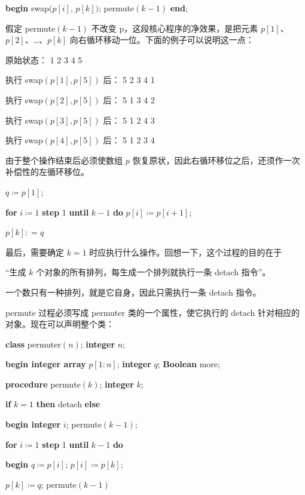 \quad \quad \textbf{begin} swap$(p[i]$, $p[k])$; permute$(k - 1)$ \textbf{end};

\noindent
假定 permute$(k - 1)$ 不改变 p，这段核心程序的净效果，是把元素 $p[1]$、$p[2]$、\dots、$p[k]$ 向右循环移动一位。下面的例子可以说明这一点：

\quad 原始状态：\tabto*{12em}  1 2 3 4 5

\quad 执行 swap$(p[1], p[5])$ 后：\tabto*{12em} 5 2 3 4 1

\quad 执行 swap$(p[2], p[5])$ 后：\tabto*{12em}  5 1 3 4 2

\quad 执行 swap$(p[3], p[5])$ 后：\tabto*{12em}  5 1 2 4 3

\quad 执行 swap$(p[4], p[5])$ 后：\tabto*{12em}  5 1 2 3 4

\noindent
由于整个操作结束后必须使数组 $p$ 恢复原状，因此右循环移位之后，还须作一次补偿性的左循环移位。

\quad $q\coloneq p[1];$

\quad \textbf{for} $i\coloneq 1$ \textbf{step} 1 \textbf{until} $k - 1$ \textbf{do} $p[i]\coloneq p[i + 1]$;

\quad $p[k]: = q$

\noindent
最后，需要确定 $k = 1$ 时应执行什么操作。回想一下，这个过程的目的在于

\parindent\quad “生成 $k$ 个对象的所有排列，每生成一个排列就执行一条 detach 指令”。

\noindent
一个数只有一种排列，就是它自身，因此只需执行一条 detach 指令。

permute 过程必须写成 permuter 类的一个属性，使它执行的 detach 针对相应的对象。现在可以声明整个类：

\quad \textbf{class} permuter$(n)$; \textbf{integer} $n$;

\quad \textbf{begin integer array} $p[1:n]$; \textbf{integer} $q$; \textbf{Boolean} more;

\quad \quad \textbf{procedure} permute$(k)$; \textbf{integer} $k$;

\quad \quad \textbf{if} $k = 1$ \textbf{then} detach \textbf{else}

\quad \quad \textbf{begin integer} $i$; permute$(k - 1)$;

\quad \quad \quad \textbf{for} $i\coloneq 1$ \textbf{step} 1 \textbf{until} $k - 1$ \textbf{do}

\quad \quad \quad \textbf{begin} $q\coloneq p[i]$; $p[i]\coloneq p[k]$;

\quad \quad \quad \quad $p[k]\coloneq q$; permute$(k - 1)$

